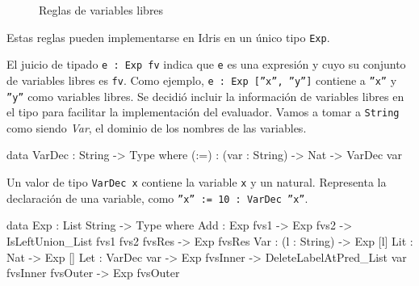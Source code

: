 \begin{figure}[h]

\centering

\begin{subfigure}{0.5\linewidth}
\centering
{}
\end{subfigure}%

\bigskip

\begin{subfigure}{0.5\linewidth}
\centering
{}
\end{subfigure}%

\bigskip

\begin{subfigure}{0.5\linewidth}
\centering
{}
\end{subfigure}%

\bigskip

\begin{subfigure}{0.5\linewidth}
\centering
{}
\end{subfigure}%

\caption{Reglas de variables libres}
\label{fig:RulesFreeVariables}
\end{figure}

Estas reglas pueden implementarse en Idris en un único tipo \texttt{Exp}.

El juicio de tipado \texttt{e : Exp fv} indica que \texttt{e} es una expresión y cuyo su conjunto de variables libres es \texttt{fv}. Como ejemplo, \texttt{e : Exp [''x'', ''y'']} contiene a \texttt{''x''} y \texttt{''y''} como variables libres. Se decidió incluir la información de variables libres en el tipo para facilitar la implementación del evaluador. Vamos a tomar a \texttt{String} como siendo \textit{Var}, el dominio de los nombres de las variables.

\begin{code}
data VarDec : String -> Type where
  (:=) : (var : String) -> Nat -> VarDec var
\end{code}

Un valor de tipo \texttt{VarDec x} contiene la variable \texttt{x} y un natural. Representa la declaración de una variable, como \texttt{''x'' := 10 : VarDec ''x''}.

\begin{code}
data Exp : List String -> Type where
  Add : Exp fvs1 -> Exp fvs2 ->
    IsLeftUnion_List fvs1 fvs2 fvsRes ->
    Exp fvsRes
  Var : (l : String) -> Exp [l]
  Lit : Nat -> Exp []
  Let : VarDec var -> Exp fvsInner ->
    DeleteLabelAtPred_List var fvsInner fvsOuter ->
    Exp fvsOuter
\end{code}

